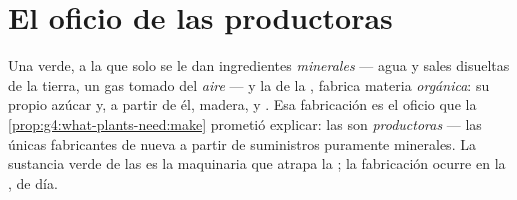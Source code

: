 \section{El oficio de las productoras}

\begin{proposition}\label{prop:g6:plants-are-producers:produce}
Una  verde, a la que solo se le dan ingredientes
\emph{minerales} --- agua y sales disueltas de la tierra, un gas tomado
del \emph{aire} --- y la  de la \emph{}, fabrica materia
\emph{orgánica}: su propio azúcar y, a partir de él, madera,  y
. Esa fabricación es el oficio que la
\cref{prop:g4:what-plants-need:make} prometió explicar: las  son
\emph{productoras} --- las únicas fabricantes de
 nueva a partir de suministros puramente minerales. La
sustancia verde de las  es la maquinaria que atrapa la ; la
fabricación ocurre en la , de día.
\end{proposition}
\admitted

